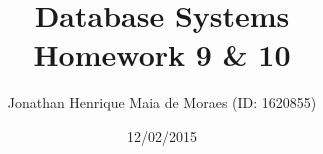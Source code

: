 \title{Database Systems \\ Homework 9 \& 10}
\author{Jonathan Henrique Maia de Moraes (ID: 1620855)}
\date{12/02/2015}
\maketitle

